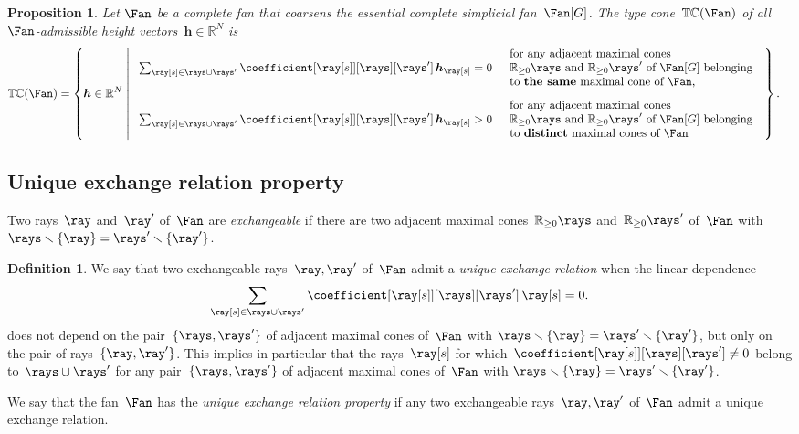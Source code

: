 \documentclass{amsart}
\newtheorem{proposition}[theorem]{Proposition}
\theoremstyle{definition}
\newtheorem{definition}[theorem]{Definition}
\newcommand{\R}{\mathbb{R}} %
\renewcommand{\b}[1]{{\boldsymbol{#1}}} %
\newcommand{\ssm}{\smallsetminus} %
\newcommand{\darkblue}{\color{darkblue}} %
\newcommand{\defn}[1]{\textsl{\darkblue #1}} %
\newcommand{\typeCone}{\mathbb{TC}} %
\begin{document}
\begin{proposition}
\label{prop:non-simplicial}
Let $\Fan$ be a complete fan that coarsens the essential complete simplicial fan~$\Fan[G]$.
The \defn{type cone}~$\typeCone(\Fan)$ of all $\Fan$-admissible height vectors~$\b{h} \in \R^N$ is
\begin{align*}
\typeCone(\Fan) 
& = \left\{\b{h} \in \R^N\;\middle|\;
\begin{array}{ll}
\sum_{\ray[s] \in \rays \cup \rays'} \coefficient[{\ray[s]}][\rays][\rays'] \, \b{h}_{\ray[s]} = 0
& \begin{array}{l} \text{for any adjacent maximal cones} \\ \text{$\R_{\ge0}\rays$ and~$\R_{\ge0}\rays'$ of~$\Fan[G]$ belonging}\\\text{to \textbf{the same} maximal cone of $\Fan$,}\end{array}
\\[.7cm]
\sum_{\ray[s] \in \rays \cup \rays'} \coefficient[{\ray[s]}][\rays][\rays'] \, \b{h}_{\ray[s]} > 0
& \begin{array}{l} \text{for any adjacent maximal cones} \\ \text{$\R_{\ge0}\rays$ and~$\R_{\ge0}\rays'$ of~$\Fan[G]$ belonging}\\\text{to \textbf{distinct} maximal cones of $\Fan$}\end{array}
\end{array}
\right\}.
\end{align*}
\end{proposition}


\subsection{Unique exchange relation property}
\label{subsec:uniqueExchangeProperty}

Two rays~$\ray$ and~$\ray'$ of~$\Fan$ are \defn{exchangeable} if there are two adjacent maximal cones~$\R_{\ge0}\rays$ and~$\R_{\ge0}\rays'$ of~$\Fan$ with ${\rays \ssm \{\ray\} = \rays' \ssm \{\ray'\}}$.

\begin{definition}
\label{def:uerp}
We say that two exchangeable rays~$\ray, \ray'$ of~$\Fan$ admit a \defn{unique exchange relation} when the linear dependence
\[
\sum_{\ray[s] \in \rays \cup \rays'} \coefficient[{\ray[s]}][\rays][\rays'] \, \ray[s] = 0.
\]
does not depend on the pair~$\{\rays, \rays'\}$ of adjacent maximal cones of~$\Fan$ with $\rays \ssm \{\ray\} = \rays' \ssm \{\ray'\}$, but only on the pair of rays~$\{\ray, \ray'\}$.
This implies in particular that the rays~$\ray[s]$ for which~$\coefficient[{\ray[s]}][\rays][\rays'] \ne 0$ belong to~$\rays \cup \rays'$ for any pair~$\{\rays, \rays'\}$ of adjacent maximal cones of~$\Fan$ with $\rays \ssm \{\ray\} = \rays' \ssm \{\ray'\}$. 

We say that the fan~$\Fan$ has the \defn{unique exchange relation property} if any two exchangeable rays~$\ray, \ray'$ of~$\Fan$ admit a unique exchange relation.
\end{definition}
\end{document}
